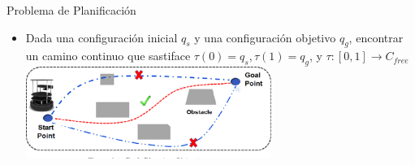 \documentclass[
	11pt, %
]{beamer}
\begin{document}
\begin{frame}{Problema de Planificación}
  \begin{itemize}
  \item Dada una configuración inicial $q_{s}$ y una configuración objetivo $q_{g}$, encontrar un camino continuo que sastiface $\tau (0) = q_{s}, \tau (1)=q_{g}$, y $\tau :[0,1] \rightarrow C_{free}$ \\
    \centering
    \bigskip %
    \includegraphics[angle=0,width=8cm]{path_plan}
  \end{itemize}
\end{frame}

\end{document}

